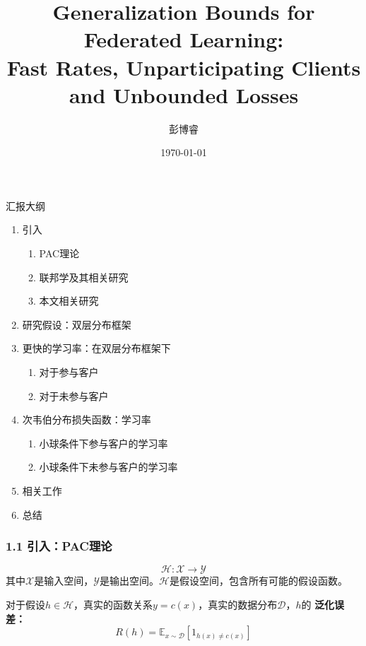 \documentclass{beamer}
\title{Generalization Bounds for Federated Learning:\\ Fast Rates, Unparticipating Clients and Unbounded Losses}
\author{彭博睿}
\institute{中国人民大学统计学院}
\date{\today}
\begin{document}
\frame{\titlepage}

\begin{frame}{汇报大纲}
    \begin{enumerate}
        \item 引入
        \begin{enumerate}
            \item PAC理论
            \item 联邦学及其相关研究
            \item 本文相关研究
        \end{enumerate}
        \item 研究假设：双层分布框架 
        \item 更快的学习率：在双层分布框架下
        \begin{enumerate}
            \item 对于参与客户
            \item 对于未参与客户
        \end{enumerate}
        \item 次韦伯分布损失函数：学习率
        \begin{enumerate}
            \item 小球条件下参与客户的学习率
            \item 小球条件下未参与客户的学习率
        \end{enumerate}
        \item 相关工作
        \item 总结
    \end{enumerate}
\end{frame}

\begin{frame}
\frametitle{1.1 引入：PAC理论}
\begin{definition}[假设空间]
    \begin{equation*}
        \mathcal{H}:\mathcal{X}\rightarrow\mathcal{Y}
    \end{equation*}
其中$\mathcal{X}$是输入空间，$\mathcal{Y}$是输出空间。$\mathcal{H}$是假设空间，包含所有可能的假设函数。
\end{definition}
\begin{definition}[泛化误差]
    对于假设$h \in \mathcal{H}$，真实的函数关系$y = c(x)$，真实的数据分布$\mathcal{D}$，$h$的 \bf{泛化误差}：
    \begin{equation*}
        R(h)=\mathbb{E}_{x\sim\mathcal{D}}[1_{h(x)\neq c(x)}]
    \end{equation*}
\end{definition}
\end{frame}
\end{document}
